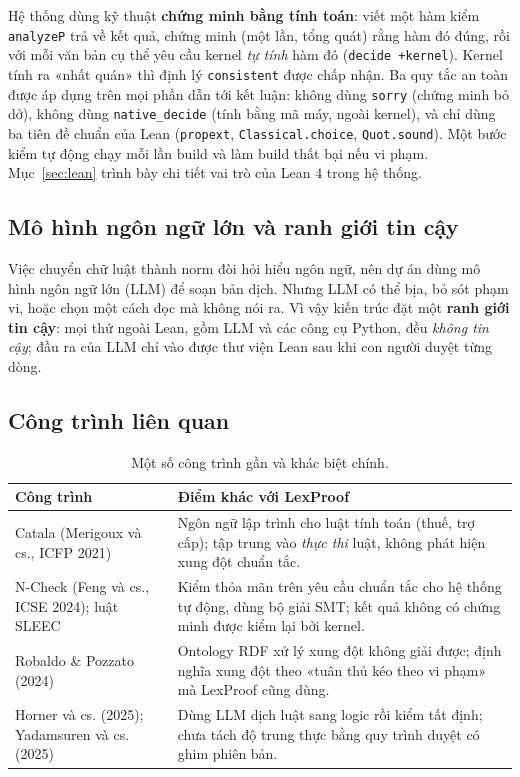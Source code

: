 \documentclass[12pt,a4paper]{article}
\newcommand{\code}[1]{\texttt{#1}}
\newcommand{\term}[1]{\textbf{#1}}
\begin{document}
Hệ thống dùng kỹ thuật \term{chứng minh bằng tính toán}: viết một hàm kiểm \code{analyzeP} trả về kết quả, chứng minh (một
lần, tổng quát) rằng hàm đó đúng, rồi với mỗi văn bản cụ thể yêu cầu kernel \emph{tự tính} hàm đó (\code{decide +kernel}).
Kernel tính ra «nhất quán» thì định lý \code{consistent} được chấp nhận. Ba quy tắc an toàn được áp dụng trên mọi phần dẫn
tới kết luận: không dùng \code{sorry} (chứng minh bỏ dở), không dùng \code{native\_decide} (tính bằng mã máy, ngoài kernel),
và chỉ dùng ba tiên đề chuẩn của Lean (\code{propext}, \code{Classical.choice}, \code{Quot.sound}). Một bước kiểm tự động
chạy mỗi lần build và làm build thất bại nếu vi phạm. Mục~\ref{sec:lean} trình bày chi tiết vai trò của Lean 4 trong hệ thống.

\subsection{Mô hình ngôn ngữ lớn và ranh giới tin cậy}

Việc chuyển chữ luật thành norm đòi hỏi hiểu ngôn ngữ, nên dự án dùng mô hình ngôn ngữ lớn (LLM) để soạn bản dịch. Nhưng
LLM có thể bịa, bỏ sót phạm vi, hoặc chọn một cách đọc mà không nói ra. Vì vậy kiến trúc đặt một \term{ranh giới tin cậy}:
mọi thứ ngoài Lean, gồm LLM và các công cụ Python, đều \emph{không tin cậy}; đầu ra của LLM chỉ vào được thư viện Lean sau
khi con người duyệt từng dòng.

\subsection{Công trình liên quan}

\begin{table}[H]
\centering\small
\caption{Một số công trình gần và khác biệt chính.}
\begin{tabularx}{\textwidth}{>{\raggedright\arraybackslash}p{4.6cm}L}
\toprule
Công trình & Điểm khác với LexProof\\
\midrule
Catala (Merigoux và cs., ICFP 2021) & Ngôn ngữ lập trình cho luật tính toán (thuế, trợ cấp); tập trung vào \emph{thực thi}
luật, không phát hiện xung đột chuẩn tắc.\\
N-Check (Feng và cs., ICSE 2024); luật SLEEC & Kiểm thỏa mãn trên yêu cầu chuẩn tắc cho hệ thống tự động, dùng bộ giải
SMT; kết quả không có chứng minh được kiểm lại bởi kernel.\\
Robaldo \& Pozzato (2024) & Ontology RDF xử lý xung đột không giải được; định nghĩa xung đột theo «tuân thủ kéo theo vi phạm»
mà LexProof cũng dùng.\\
Horner và cs. (2025); Yadamsuren và cs. (2025) & Dùng LLM dịch luật sang logic rồi kiểm tất định; chưa tách độ trung thực
bằng quy trình duyệt có ghim phiên bản.\\
\bottomrule
\end{tabularx}
\end{table}
\end{document}
